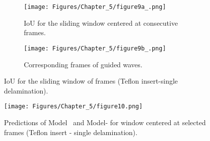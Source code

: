 \begin{figure} [!h]
	\begin{subfigure}[b]{1\textwidth}
		\centering
		\texttt{[image: Figures/Chapter\_5/figure9a\_.png]}
		\caption{IoU for the sliding window centered at consecutive frames.}
		\label{fig:CFRP_Teflon_3o_IoU_}
	\end{subfigure}
	\begin{subfigure}[b]{1\textwidth}
		\centering
		\texttt{[image: Figures/Chapter\_5/figure9b\_.png]}
		\caption{Corresponding frames of guided waves.} 
		\label{fig:CFRP_teflon_3o_shapes_}
	\end{subfigure}
	\caption{IoU for the sliding window of frames (Teflon insert-single delamination).}
	\label{fig:CFRP_Teflon_3o_IoU_centre_window}
\end{figure} 

\begin{figure}[!h]
	\centering
	\texttt{[image: Figures/Chapter\_5/figure10.png]}
	\caption{Predictions of Model~ and Model- for window centered at selected frames (Teflon insert - single delamination).}
	\label{fig:CFRP_Teflon_3o_predictions}
\end{figure}

